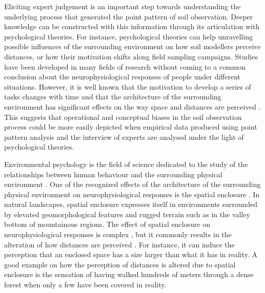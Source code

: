 Eliciting expert judgement is an important step towards understanding the underlying process that generated 
the point pattern of soil observation. Deeper knowledge can be constructed with this information 
through its articulation with psychological theories. For instance, psychological theories can help unravelling
 possible influences of the surrounding environment on how soil modellers perceive distances, or how 
their motivation shifts along field sampling campaigns. Studies have been developed in many fields of 
research \cite{Hull1932, BonnesEtAl2002, StampsEtAl2004, BonezziEtAl2011, Toure-TilleryEtAl2011a} without 
coming to a common conclusion about the neurophysiological responses of people under different situations. 
However, it is well known that the motivation to develop a series of tasks changes with time 
\cite{BonezziEtAl2011, Toure-TilleryEtAl2011a} and that the architecture of the surrounding environment has 
significant effects on the way space and distances are perceived \cite{Coeterier1994, EpsteinEtAl1998}. This 
suggests that operational and conceptual biases in the soil observation process could be more easily depicted 
when empirical data produced using point pattern analysis and the interview of experts are analysed under the 
light of psychological theories.

Environmental psychology is the field of science dedicated to the study of the relationships between human 
behaviour and the surrounding physical environment \cite{BonnesEtAl2002}. One of the recognized effects of the 
architecture of the surrounding physical environment on neurophysiological responses is the spatial enclosure 
\cite{EpsteinEtAl1998}. In natural landscapes, spatial enclosure expresses itself in environments surrounded by
elevated geomorphological features and rugged terrain such as in the valley bottom of mountainous regions. The 
effect of spatial enclosure on neurophysiological responses is complex \cite{StampsEtAl2004}, but it commonly 
results in the alteration of how distances are perceived \cite{Coeterier1994}. For instance, it can induce the 
perception that an enclosed space has a size larger than what it has in reality. A good example on how the 
perception of distances is altered due to spatial enclosure is the sensation of having walked hundreds of 
meters 
through a dense forest when only a few have been covered in reality.

